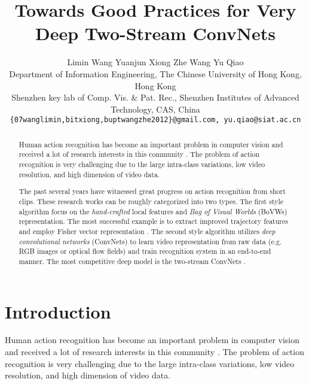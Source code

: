 \documentclass[10pt,twocolumn,letterpaper]{article}
\begin{document}
\title{Towards Good Practices for Very Deep Two-Stream ConvNets}

\author{Limin Wang \quad \quad Yuanjun Xiong \quad \quad Zhe Wang \quad \quad Yu Qiao \\
\small Department of Information Engineering, The Chinese University of Hong Kong, Hong Kong \\
\small Shenzhen key lab of Comp. Vis. \& Pat. Rec.,  Shenzhen Institutes of Advanced Technology, CAS, China \\
{\tt\small \{07wanglimin,bitxiong,buptwangzhe2012\}@gmail.com, yu.qiao@siat.ac.cn}
}

\maketitle

\begin{abstract}
  Human action recognition has become an important problem in computer vision and received a lot of research interests in this community \cite{SimonyanZ14,WangS13a,WangQT15a}. The problem of action recognition is very challenging due to the large intra-class variations, low video resolution, and high dimension of video data.

  The past several years have witnessed great progress on action recognition from short clips. These research works can be roughly categorized into two types. The first style algorithm focus on the \emph{hand-crafted} local features and \emph{Bag of Visual Worlds} (BoVWs) representation. The most successful example is to extract improved trajectory features \cite{WangS13a} and employ Fisher vector representation \cite{SanchezPMV13}. The second style algorithm utilizes \emph{deep convolutional networks} (ConvNets) to learn video representation from raw data (e.g. RGB images or optical flow fields) and train recognition system in an end-to-end manner. The most competitive deep model is the two-stream ConvNets \cite{SimonyanZ14}.
\end{abstract}

\section{Introduction}
Human action recognition has become an important problem in computer vision and received a lot of research interests in this community \cite{SimonyanZ14,WangS13a,WangQT15a}. The problem of action recognition is very challenging due to the large intra-class variations, low video resolution, and high dimension of video data.
\end{document}
